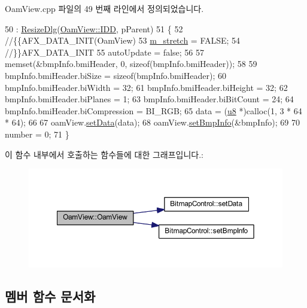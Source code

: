 Oam\+View.\+cpp 파일의 49 번째 라인에서 정의되었습니다.


\begin{DoxyCode}
50   : \mbox{\hyperlink{class_resize_dlg_a87bab778e9312f274ebe750d4c3a67ee}{ResizeDlg}}(\mbox{\hyperlink{class_oam_view_ac29ce9205f4917f10053370f06262098aab00e4e9b26ccb7800ace12861a0304c}{OamView::IDD}}, pParent)
51 \{
52   \textcolor{comment}{//\{\{AFX\_DATA\_INIT(OamView)}
53   \mbox{\hyperlink{class_oam_view_a0eeb8a1eeda8d53816c2696d70d61da4}{m\_stretch}} = FALSE;
54   \textcolor{comment}{//\}\}AFX\_DATA\_INIT}
55   autoUpdate = \textcolor{keyword}{false};
56   
57   memset(&bmpInfo.bmiHeader, 0, \textcolor{keyword}{sizeof}(bmpInfo.bmiHeader));
58   
59   bmpInfo.bmiHeader.biSize = \textcolor{keyword}{sizeof}(bmpInfo.bmiHeader);
60   bmpInfo.bmiHeader.biWidth = 32;
61   bmpInfo.bmiHeader.biHeight = 32;
62   bmpInfo.bmiHeader.biPlanes = 1;
63   bmpInfo.bmiHeader.biBitCount = 24;
64   bmpInfo.bmiHeader.biCompression = BI\_RGB;
65   data = (\mbox{\hyperlink{_system_8h_aed742c436da53c1080638ce6ef7d13de}{u8}} *)calloc(1, 3 * 64 * 64);
66 
67   oamView.\mbox{\hyperlink{class_bitmap_control_aa6206183896caf192a37709fa5d7b8d2}{setData}}(data);
68   oamView.\mbox{\hyperlink{class_bitmap_control_a301c52fc62de4368fccdcdc93cefad0b}{setBmpInfo}}(&bmpInfo);
69 
70   number = 0;
71 \}
\end{DoxyCode}
이 함수 내부에서 호출하는 함수들에 대한 그래프입니다.\+:
\nopagebreak
\begin{figure}[H]
\begin{center}
\leavevmode
\includegraphics[width=350pt]{class_oam_view_a58028e15d10221a62f25799321516416_cgraph}
\end{center}
\end{figure}


\subsection{멤버 함수 문서화}
\mbox{\label{class_oam_view_a0f3152b720294d92994d5240523fa64e}} 
